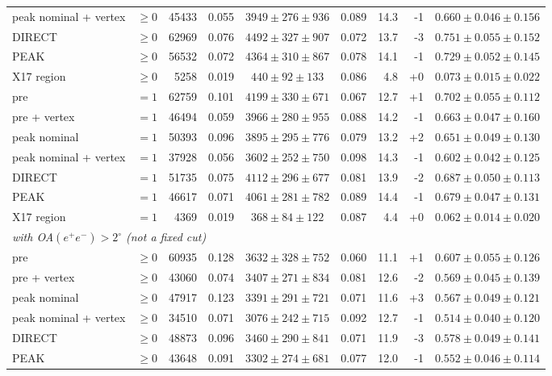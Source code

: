 \begin{table}[H]
\begin{tabular}{llrrcrrrc}
peak nominal + vertex & $\geq0$ & 45433 & 0.055 & $3949\pm276\pm936$ & 0.089 & 14.3 & -1 & $0.660\pm0.046\pm0.156$ \\
DIRECT & $\geq0$ & 62969 & 0.076 & $4492\pm327\pm907$ & 0.072 & 13.7 & -3 & $0.751\pm0.055\pm0.152$ \\
PEAK & $\geq0$ & 56532 & 0.072 & $4364\pm310\pm867$ & 0.078 & 14.1 & -1 & $0.729\pm0.052\pm0.145$ \\
X17 region & $\geq0$ & 5258 & 0.019 & $440\pm92\pm133$ & 0.086 & 4.8 & +0 & $0.073\pm0.015\pm0.022$ \\
\addlinespace
pre & $=1$ & 62759 & 0.101 & $4199\pm330\pm671$ & 0.067 & 12.7 & +1 & $0.702\pm0.055\pm0.112$ \\
pre + vertex & $=1$ & 46494 & 0.059 & $3966\pm280\pm955$ & 0.088 & 14.2 & -1 & $0.663\pm0.047\pm0.160$ \\
peak nominal & $=1$ & 50393 & 0.096 & $3895\pm295\pm776$ & 0.079 & 13.2 & +2 & $0.651\pm0.049\pm0.130$ \\
peak nominal + vertex & $=1$ & 37928 & 0.056 & $3602\pm252\pm750$ & 0.098 & 14.3 & -1 & $0.602\pm0.042\pm0.125$ \\
DIRECT & $=1$ & 51735 & 0.075 & $4112\pm296\pm677$ & 0.081 & 13.9 & -2 & $0.687\pm0.050\pm0.113$ \\
PEAK & $=1$ & 46617 & 0.071 & $4061\pm281\pm782$ & 0.089 & 14.4 & -1 & $0.679\pm0.047\pm0.131$ \\
X17 region & $=1$ & 4369 & 0.019 & $368\pm84\pm122$ & 0.087 & 4.4 & +0 & $0.062\pm0.014\pm0.020$ \\
\midrule
\multicolumn{9}{l}{\emph{with OA$(e^+e^-)>2^\circ$ (not a fixed cut)}} \\
pre & $\geq0$ & 60935 & 0.128 & $3632\pm328\pm752$ & 0.060 & 11.1 & +1 & $0.607\pm0.055\pm0.126$ \\
pre + vertex & $\geq0$ & 43060 & 0.074 & $3407\pm271\pm834$ & 0.081 & 12.6 & -2 & $0.569\pm0.045\pm0.139$ \\
peak nominal & $\geq0$ & 47917 & 0.123 & $3391\pm291\pm721$ & 0.071 & 11.6 & +3 & $0.567\pm0.049\pm0.121$ \\
peak nominal + vertex & $\geq0$ & 34510 & 0.071 & $3076\pm242\pm715$ & 0.092 & 12.7 & -1 & $0.514\pm0.040\pm0.120$ \\
DIRECT & $\geq0$ & 48873 & 0.096 & $3460\pm290\pm841$ & 0.071 & 11.9 & -3 & $0.578\pm0.049\pm0.141$ \\
PEAK & $\geq0$ & 43648 & 0.091 & $3302\pm274\pm681$ & 0.077 & 12.0 & -1 & $0.552\pm0.046\pm0.114$ \\

\end{tabular}
\end{table}
